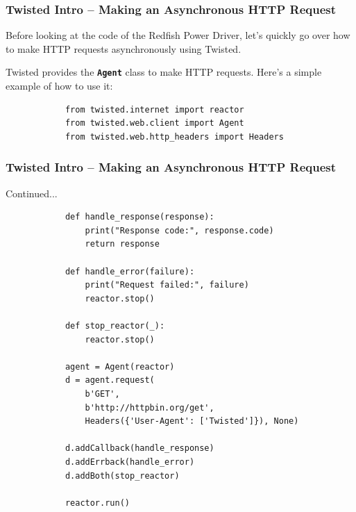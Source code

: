 \documentclass{beamer}
\begin{document}
    \begin{frame}[containsverbatim]
        \frametitle{Twisted Intro -- Making an Asynchronous HTTP Request}
        Before looking at the code of the Redfish Power Driver, let's quickly go over how to make HTTP requests asynchronously using Twisted.

        Twisted provides the \textbf{\texttt{Agent}} class to make HTTP requests. Here's a simple example of how to use it:

        \begin{lstlisting}
            from twisted.internet import reactor
            from twisted.web.client import Agent
            from twisted.web.http_headers import Headers
        \end{lstlisting}
    \end{frame}

    \begin{frame}[containsverbatim]
        \frametitle{Twisted Intro -- Making an Asynchronous HTTP Request}
        Continued...
        \begin{lstlisting}
            def handle_response(response):
                print("Response code:", response.code)
                return response

            def handle_error(failure):
                print("Request failed:", failure)
                reactor.stop()

            def stop_reactor(_):
                reactor.stop()

            agent = Agent(reactor)
            d = agent.request(
                b'GET',
                b'http://httpbin.org/get',
                Headers({'User-Agent': ['Twisted']}), None)

            d.addCallback(handle_response)
            d.addErrback(handle_error)
            d.addBoth(stop_reactor)

            reactor.run()
        \end{lstlisting}
    \end{frame}
\end{document}
